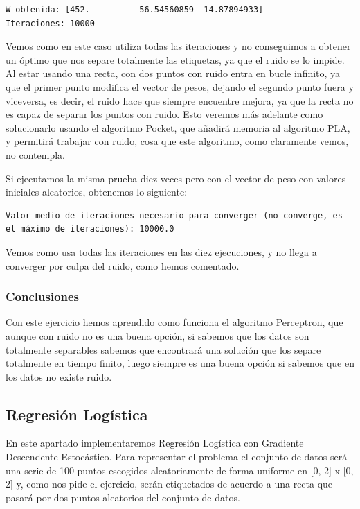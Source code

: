 \documentclass[12pt, spanish]{article}
\begin{document}
\begin{lstlisting}
W obtenida: [452.          56.54560859 -14.87894933]
Iteraciones: 10000
\end{lstlisting}

Vemos como en este caso utiliza todas las iteraciones y no conseguimos a obtener un óptimo que nos separe totalmente las etiquetas, ya que el ruido se lo impide. Al estar usando una recta, con dos puntos con ruido entra en bucle infinito, ya que el primer punto modifica el vector de pesos, dejando el segundo punto fuera y viceversa, es decir, el ruido hace que siempre encuentre mejora, ya que la recta no es capaz de separar los puntos con ruido. Esto veremos más adelante como solucionarlo usando el algoritmo Pocket, que añadirá memoria al algoritmo PLA, y permitirá trabajar con ruido, cosa que este algoritmo, como claramente vemos, no contempla.


Si ejecutamos la misma prueba diez veces pero con el vector de peso con valores iniciales aleatorios, obtenemos lo siguiente:

\begin{lstlisting}
Valor medio de iteraciones necesario para converger (no converge, es el máximo de iteraciones): 10000.0
\end{lstlisting}

Vemos como usa todas las iteraciones en las diez ejecuciones, y no llega a converger por culpa del ruido, como hemos comentado.


\subsubsection{Conclusiones}

Con este ejercicio hemos aprendido como funciona el algoritmo Perceptron, que aunque con ruido no es una buena opción, si sabemos que los datos son totalmente separables sabemos que encontrará una solución que los separe totalmente en tiempo finito, luego siempre es una buena opción si sabemos que en los datos no existe ruido.


\newpage

\subsection{Regresión Logística}

En este apartado implementaremos Regresión Logística con Gradiente Descendente Estocástico. Para representar el problema el conjunto de datos será una serie de 100 puntos escogidos aleatoriamente de forma uniforme en [0, 2] x [0, 2] y, como nos pide el ejercicio, serán etiquetados de acuerdo a una recta que pasará por dos puntos aleatorios del conjunto de datos.
\end{document}
